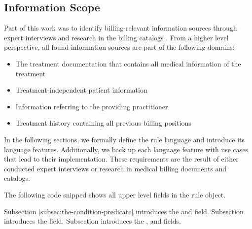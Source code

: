 \subsection{Information Scope}
Part of this work was
to identify billing-relevant information sources through expert interviews and research in the billing catalogs \addcite.
From a higher level perspective, all found information sources are part of the following domains:
\begin{itemize}
    \item The treatment documentation that contains all medical information of the treatment
    \item Treatment-independent patient information
    \item Information referring to the providing practitioner
    \item Treatment history containing all previous billing positions
\end{itemize}

In the following sections, we formally define the rule language and introduce its language features.
Additionally, we back up each language feature with use cases that lead to their implementation.
These requirements are the result of either conducted expert interviews or research in medical billing documents and catalogs.

The following code snipped \addref shows all upper level fields in the rule object.



Subsection \ref{subsec:the-condition-predicate} introduces the  and   field.
Subsection \addref introduces the  field.
Subsection \addref introduces the ,  and  fields.



